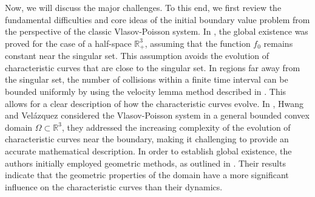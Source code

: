 \documentclass[11pt,reqno]{amsart}%
\theoremstyle{definition}
\theoremstyle{remark}
\begin{document}
Now, we will discuss the major challenges. To this end, we first review the fundamental difficulties and core ideas of the initial boundary value problem from the perspective of the classic Vlasov-Poisson system. 
In \cite{G1},   the global existence was proved for the case of a half-space $\mathbb{R}^{3}_{+}$, assuming that the function $f_{0}$ remains constant near the singular set. This assumption  avoids the evolution of characteristic curves that are close to the singular set.
  In regions far away from the singular set, the number of collisions within a finite time interval can be bounded uniformly by using the velocity lemma method described in  
 \cite{LP}. This allows for a clear description of how the characteristic curves evolve. 
%
  In \cite{HV}, Hwang and Vel\'{a}zquez considered the Vlasov-Poisson system in a general bounded convex domain $\Omega\subset \mathbb{R}^{3}$, they addressed  the increasing complexity of the evolution of characteristic curves near the boundary, making it challenging to provide an accurate mathematical description. In order to establish global existence, the authors initially employed geometric methods, as outlined in \cite{HV}. Their results indicate that the geometric properties of the domain have a more significant influence on the characteristic curves than their dynamics.  


\end{document}
